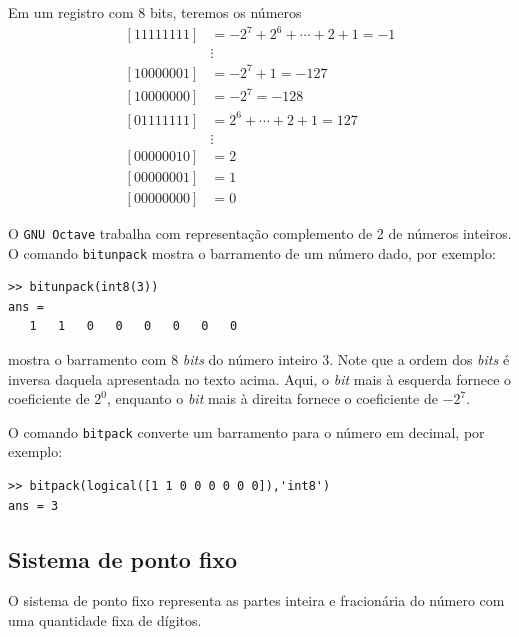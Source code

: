 \begin{ex}
Em um registro com $8$ bits, teremos os números
\begin{equation}
  \begin{split}
    [11111111] &= -2^7+2^{6}+\cdots+2+1=-1\\
    &\vdots   \\
    [10000001] &= -2^7+1 = -127 \\
    [10000000] &= -2^7   = -128 \\
    [01111111] &= 2^6+\cdots+2+1=127 \\
    &\vdots   \\
    [00000010] &= 2 \\
    [00000001] &= 1 \\
    [00000000] &= 0
  \end{split}
\end{equation}

\ifisoctave
O \verb+GNU Octave+ trabalha com representação complemento de 2 de números inteiros. O comando \verb+bitunpack+ mostra o barramento de um número dado, por exemplo:
\begin{verbatim}
>> bitunpack(int8(3))
ans =
   1   1   0   0   0   0   0   0
\end{verbatim}
mostra o barramento com $8$ \emph{bits} do número inteiro $3$. Note que a ordem dos \emph{bits} é inversa daquela apresentada no texto acima. Aqui, o \emph{bit} mais à esquerda fornece o coeficiente de $2^0$, enquanto o \emph{bit} mais à direita fornece o coeficiente de $-2^7$.

O comando \verb+bitpack+ converte um barramento para o número em decimal, por exemplo:
\begin{verbatim}
>> bitpack(logical([1 1 0 0 0 0 0 0]),'int8')
ans = 3
\end{verbatim}
\fi
\end{ex}

\subsection{Sistema de ponto fixo}

O sistema de ponto fixo representa as partes inteira e fracionária do número com uma quantidade fixa de dígitos.

